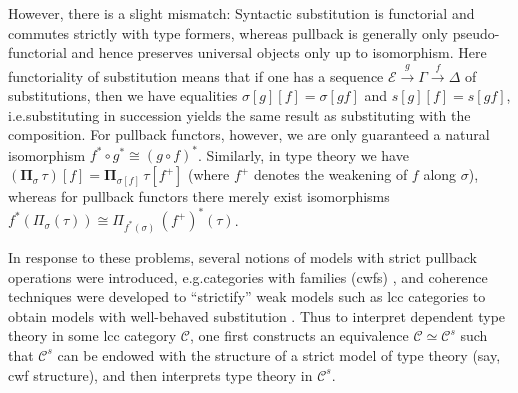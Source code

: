 \documentclass[a4paper]{article}
\theoremstyle{remark}
\theoremstyle{definition}
\begin{document}
However, there is a slight mismatch:
Syntactic substitution is functorial and commutes strictly with type formers, whereas pullback is generally only pseudo-functorial and hence preserves universal objects only up to isomorphism.
Here functoriality of substitution means that if one has a sequence $\mathcal{E} \xrightarrow{g} \Gamma \xrightarrow{f} \Delta$ of substitutions, then we have equalities $\sigma[g][f] = \sigma[gf]$ and $s[g][f] = s[gf]$, i.e.\@ substituting in succession yields the same result as substituting with the composition.
For pullback functors, however, we are only guaranteed a natural isomorphism $f^* \circ g^* \cong (g \circ f)^*$.
Similarly, in type theory we have $(\mathbf{\Pi}_\sigma \, \tau)[f] = \mathbf{\Pi}_{\sigma[f]} \, \tau[f^+]$ (where $f^+$ denotes the weakening of $f$ along $\sigma$), whereas for pullback functors there merely exist isomorphisms $f^*(\Pi_\sigma(\tau)) \cong \Pi_{f^*(\sigma)} \, (f^+)^*(\tau)$.

In response to these problems, several notions of models with strict pullback operations were introduced, e.g.\@ categories with families (cwfs) \citep{internal-type-theory}, and coherence techniques were developed to ``strictify'' weak models such as lcc categories to obtain models with well-behaved substitution \citep{substitution-up-to-isomorphism,on-the-interpretation-of-type-theory-in-lcc-categories,the-local-universes-model}.
Thus to interpret dependent type theory in some lcc category $\mathcal{C}$, one first constructs an equivalence $\mathcal{C} \simeq \mathcal{C}^s$ such that $\mathcal{C}^s$ can be endowed with the structure of a strict model of type theory (say, cwf structure), and then interprets type theory in $\mathcal{C}^s$.
\end{document}

